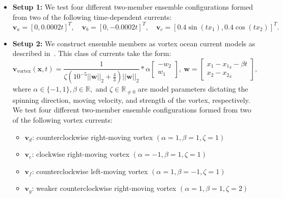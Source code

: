\documentclass[pdflatex,sn-mathphys-num]{sn-jnl}%
\def \bx{{\mathbf {x}}}
\def \bv{{\mathbf {v}}}
\def \bw{{\mathbf {w}}}
\theoremstyle{thmstyleone}%
\theoremstyle{thmstyletwo}%
\theoremstyle{thmstylethree}%
\begin{document}
\begin{itemize}
    \item \textbf{Setup 1:} We test four different two-member ensemble configurations formed from two of the following time-dependent currents:
$$
\bv_a = [0, 0.0002t]^T, \quad 
\bv_b = [0, -0.0002t]^T, \quad 
\bv_c = [0.4\sin(tx_1), 0.4\cos(tx_2)]^T.
$$



    \item \textbf{Setup 2:}  
    We construct ensemble members as vortex ocean current models as described in~\cite{Brandman2023}.  This class of currents take the form: 
\begin{equation*}
\bv_{\text{vortex}}(\bx,t)=\frac{1}{\zeta(10^{-5}||\bw||_2+\frac{4}{3})||\bw||_2}*\alpha
\begin{bmatrix}
                    -w_{2} \\
                    w_{1}
\end{bmatrix},  \ 
\bw = \begin{bmatrix}
                    x_{1} - x_{1_S}- \beta t \\
                    x_{2} - x_{2_S}
                \end{bmatrix},
\label{eq:vortex}
\end{equation*}
    where $\alpha \in \{-1,1\}, \beta \in \mathbb{R},$ 
    and $\zeta \in \mathbb{R}_{\ne 0}$ are model parameters dictating the spinning direction, moving velocity, and strength of the vortex, respectively.  We test four different two-member ensemble configurations formed from two of the following vortex currents:

    \begin{itemize}
        \item $\bv_d$: counterclockwise right-moving vortex $(\alpha=1,\beta=1,\zeta=1)$
        \vspace{0.2cm}
        \item $\bv_e$: clockwise right-moving vortex $(\alpha=-1,\beta=1,\zeta=1)$
        \vspace{0.2cm}
        \item $\bv_f$: counterclockwise left-moving vortex $(\alpha=1,\beta=-1,\zeta=1)$
        \vspace{0.2cm}
        \item $\bv_g$: weaker counterclockwise right-moving vortex $(\alpha=1,\beta=1,\zeta=2)$
        \vspace{0.2cm}
    \end{itemize}
\end{itemize}
\end{document}
